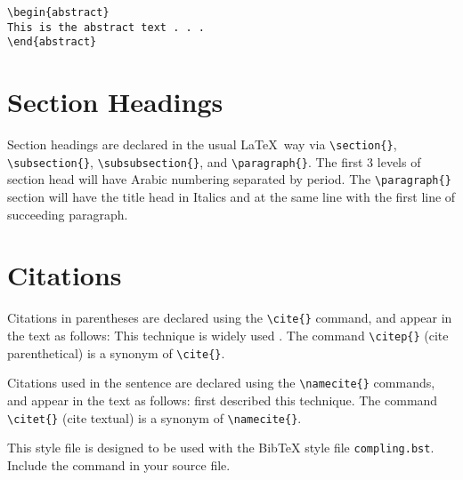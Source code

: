 \documentclass{clv3}
\begin{document}
\begin{verbatim}
\begin{abstract}
This is the abstract text . . .
\end{abstract}
\end{verbatim}

\section{Section Headings}

Section headings are declared in the usual \LaTeX\ way via \verb|\section{}|, 
\verb|\subsection{}|, \verb|\subsubsection{}|, and \verb|\paragraph{}|. The 
first 3 levels of section head will have Arabic numbering separated 
by period. The \verb|\paragraph{}| section will have the title head in Italics 
and at the same line with the first line of succeeding paragraph.

\section{Citations}
Citations in parentheses are declared using the \verb|\cite{}|
command, and appear in the text as follows: 
This technique is widely used \cite{woods}.
The command \verb|\citep{}| (cite parenthetical) is a synonym of \verb|\cite{}|.

Citations used in the sentence are declared using the \verb|\namecite{}|
commands, and appear in the text as follows: 
 first described this technique.
The command \verb|\citet{}| (cite textual) is a synonym of \verb|\namecite{}|.

This style file is designed to be used with the BibTeX
style file \verb|compling.bst|.  Include the command
\verb|| in your source file.
\end{document}
